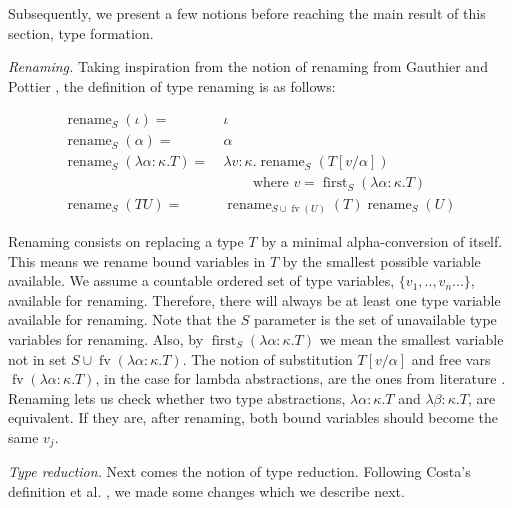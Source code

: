 \documentclass[sigplan]{acmart}
\begin{document}
Subsequently, we present a few notions before reaching the main result of this section, type formation.

\textit{Renaming.    } 
Taking inspiration from the notion of renaming from Gauthier and Pottier \cite{GauthierP04}, the definition of type renaming is as follows:


$$
\begin{aligned}
\operatorname{rename}_{S}(\iota) = &\ \iota \\
\operatorname{rename}_{S}(\alpha) = &\ \alpha \\
\operatorname{rename}_{S}(\lambda\alpha\colon\kappa . T) =  &\ \lambda v\colon\kappa . \operatorname{rename}_{S}(T[v / \alpha]) \\
 & \quad\quad \text { where } v=\operatorname{first}_{S}(\lambda\alpha\colon\kappa . T) \\
\operatorname{rename}_{S}(T U) = &\ \operatorname{rename}_{S \cup\operatorname{fv}(U)}(T) \operatorname{rename}_{S}(U)
\end{aligned}
$$
\vspace{3mm}

Renaming consists on replacing a type $T$ by a minimal alpha-conversion of itself. This means we rename bound variables in $T$ by the smallest possible variable available. We assume a countable ordered set of type variables, $\{ v_1, .., v_n ... \}$, available for renaming. Therefore, there will always be at least one type variable available for renaming.
Note that the $S$ parameter is the set of unavailable type variables for renaming.  Also, by $\operatorname{first}_{S}(\lambda\alpha\colon\kappa.T)$ we mean the smallest variable not in set $S\cup \operatorname{fv}(\lambda\alpha\colon\kappa.T)$. The notion of substitution $T[v/\alpha]$ and free vars $\operatorname{fv}(\lambda\alpha\colon\kappa.T)$, in the case for lambda abstractions, are the ones from literature \cite{tapl}.
Renaming lets us check whether two type abstractions, $\lambda\alpha\colon\kappa.T$ and $\lambda\beta\colon\kappa.T$, are equivalent. If they are, after renaming, both bound variables should become the same $v_j$.

\textit{Type reduction.     }
Next comes the notion of type reduction. Following Costa's definition et al. \cite{PocasCMV23}, we made some changes which we describe next.
\end{document}
